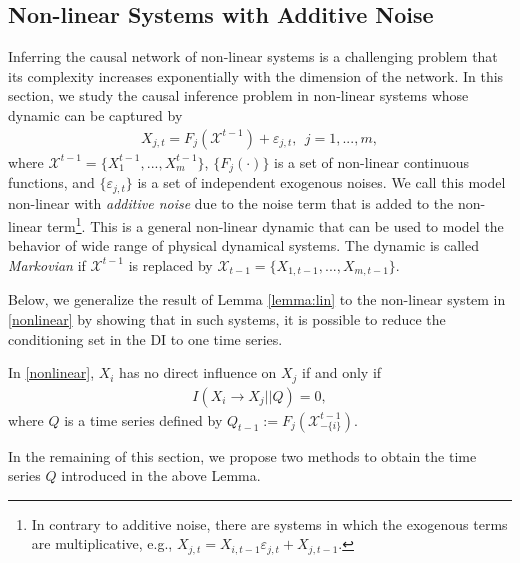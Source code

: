 \subsection{Non-linear Systems with Additive Noise}
Inferring the causal network of non-linear systems is a challenging problem that its complexity increases exponentially with the dimension of the network. 
In this section, we study the causal inference problem in non-linear systems whose dynamic can be captured by
\begin{align}\label{nonlinear}
    X_{j,t} = F_{j}(\mathcal{X}^{t-1}) + \varepsilon_{j,t}, \ \ j=1,...,m,
\end{align}
where $\mathcal{X}^{t-1}=\{X_{1}^{t-1},...,X_{m}^{t-1}\}$, $\{F_j(\cdot)\}$ is a set of non-linear continuous functions, and $\{\varepsilon_{j,t}\}$ is a set of independent exogenous noises.
We call this model non-linear with \textit{additive noise} due to the noise term that is added to the non-linear term\footnote{In contrary to additive noise, there are systems in which the exogenous terms are multiplicative, e.g., $X_{j,t}=X_{i,t-1}\varepsilon_{j,t}+X_{j,t-1}$.}.
This is a general non-linear dynamic that can be used to model the behavior of wide range of physical dynamical systems.
The dynamic is called \textit{Markovian} if $\mathcal{X}^{t-1}$ is replaced by $\mathcal{X}_{t-1}=\{X_{1,t-1},...,X_{m,t-1}\}$.

Below, we generalize the result of Lemma \ref{lemma:lin} to the non-linear system in \eqref{nonlinear} by showing that in such systems, it is possible to reduce the conditioning set in the DI to one time series. 
\begin{lemma}\label{lemma:nonlinear}
In \eqref{nonlinear}, $X_i$ has no direct influence on $X_j$ if and only if 
\begin{align}\label{eq:non-q}
I(X_{i}\rightarrow X_j || Q) =0,
\end{align}
where $Q$ is a time series defined by $Q_{t-1}:=F_{j}(\mathcal{X}^{t-1}_{-\{i\}})$. 
\end{lemma}
In the remaining of this section, we propose two methods to obtain the time series $Q$ introduced in the above Lemma. 

